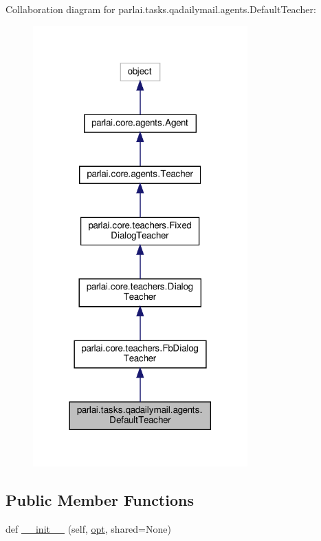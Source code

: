 Collaboration diagram for parlai.\+tasks.\+qadailymail.\+agents.\+Default\+Teacher\+:\nopagebreak
\begin{figure}[H]
\begin{center}
\leavevmode
\includegraphics[width=234pt]{d6/dc9/classparlai_1_1tasks_1_1qadailymail_1_1agents_1_1DefaultTeacher__coll__graph}
\end{center}
\end{figure}
\subsection*{Public Member Functions}
\begin{DoxyCompactItemize}
\item 
def \hyperlink{classparlai_1_1tasks_1_1qadailymail_1_1agents_1_1DefaultTeacher_a9b9a49fa6e1a61092205f2500fe4f933}{\+\_\+\+\_\+init\+\_\+\+\_\+} (self, \hyperlink{classparlai_1_1core_1_1teachers_1_1FbDialogTeacher_af7a9ec497b9cd0292d7b8fa220da7c28}{opt}, shared=None)
\end{DoxyCompactItemize}
